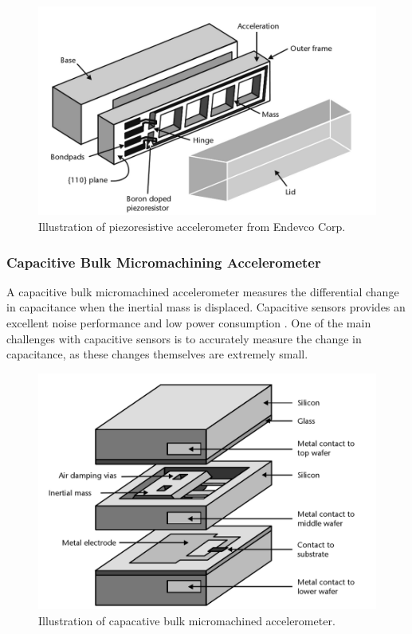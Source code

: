 \begin{figure}[h]
\centering
\includegraphics[scale=0.3]{fig/piezoresistive.png}
\caption{Illustration of piezoresistive accelerometer from Endevco Corp. \cite[p.~98]{maluf04}}
\label{fig:piezoresistive_accel}
\end{figure}

\subsubsection{Capacitive Bulk Micromachining Accelerometer}

A capacitive bulk micromachined accelerometer measures the differential change in capacitance when the inertial mass is displaced. Capacitive sensors provides an excellent noise performance and low power consumption \cite[p.~91]{kaajakari09}. One of the main challenges with capacitive sensors is to accurately measure the change in capacitance, as these changes themselves are extremely small. 

\begin{figure}[h]
\centering
\includegraphics[scale=0.25]{fig/bulk_micromachined.png}
\caption{Illustration of capacative bulk micromachined accelerometer. \cite[p.~100]{maluf04}}
\label{fig:bulk_micromachined}
\end{figure}

